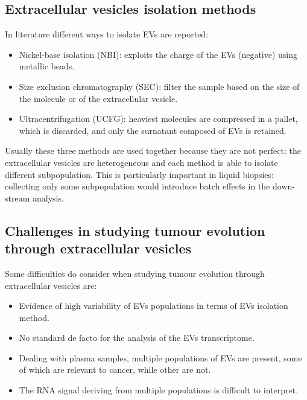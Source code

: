     \subsection{Extracellular vesicles isolation methods}
    In literature different ways to isolate EVs are reported:

    \begin{multicols}{2}
        \begin{itemize}
            \item Nickel-base isolation (NBI): exploits the charge of the EVs (negative) using metallic beads.
            \item Size exclusion chromatography (SEC): filter the sample based on the size of the molecule or of the extracellular vesicle.
            \item Ultracentrifugation (UCFG): heaviest molecules are compressed in a pallet, which is discarded, and only the surnatant composed of EVs is retained.
        \end{itemize}
    \end{multicols}

    Usually these three methods are used together because they are not perfect: the extracellular vesicles are heterogeneous and each method is able to isolate different subpopulation.
    This is particularly important in liquid biopsies: collecting only some subpopulation would introduce batch effects in the down-stream analysis.

    \subsection{Challenges in studying tumour evolution through extracellular vesicles}
    Some difficulties do consider when studying tumour evolution through extracellular vesicles are:

    \begin{multicols}{2}
        \begin{itemize}
            \item Evidence of high variability of EVs populations in terms of EVs isolation method.
            \item No standard de facto for the analysis of the EVs transcriptome.
            \item Dealing with plasma samples, multiple populations of EVs are present, some of which are relevant to cancer, while other are not.
            \item The RNA signal deriving from multiple populations is difficult to interpret.
        \end{itemize}
    \end{multicols}

